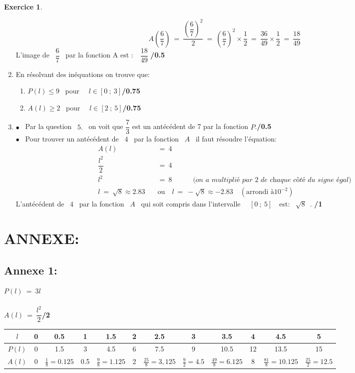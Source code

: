 \documentclass[a4paper,10pt]{article}
\theoremstyle{definition}
\theoremstyle{definition}
\newtheorem{exo}{Exercice}
\begin{document}
\begin{exo}
\begin{enumerate}
		 $$A\left(\dfrac{6}{7}\right) \ = \ \dfrac{\left(\dfrac{6}{7}\right)^2}{2} \ = \ \left(\dfrac{6}{7}\right)^2 \times \dfrac{1}{2} \ = \ \dfrac{36}{49} \times \dfrac{1}{2} \ = \ \dfrac{18}{49} $$
		 L'image de ~$\dfrac{6}{7}$~ par la fonction A est :~~$\dfrac{18}{49}$ \hfill\textbf{/0.5}
		\item En résolvant des inéquations on trouve que:
		\begin{enumerate}
			\item $P(l)\leq  9$ ~pour~~ $l\in[0~;~3]$\hfill\textbf{/0.75}
			\item $A(l)\geq 2$ ~pour~~ $l\in[2~;~5]$\hfill\textbf{/0.75}
		\end{enumerate}  
		\item  $\bullet$ ~Par la question ~$5.$~ on voit que $\dfrac{7}{3}$ est un antécédent de 7 par la fonction $P$.\hfill\textbf{/0.5}\\[1mm]
		 $\bullet$ ~Pour trouver un antécédent de ~$4$~ par la fonction ~$A$~ il faut résoudre l'équation:
		\begin{align*}
			A(l) \ &= \ 4\\
			\dfrac{l^2}{2} \ &= \ 4\\
			l^2 \ &= \ 8 \quad\quad\quad\textit{(on a multiplié par 2 de chaque côté du signe égal)}\\
			l \ = \ \sqrt{8}\approx 2.83  \quad&\text{ou}\quad l \ = \ -\sqrt{8}\approx -2.83 \quad(\text{arrondi à} 10^{-2})	
		\end{align*} 
		L'antécédent de ~$4$~ par la fonction ~$A$~ qui soit compris dans l'intervalle ~~$[0~;~5]$~~est: ~$\sqrt{8}$~.  \hfill\textbf{/1}		
	\end{enumerate}	
\end{exo}


\newpage
\section*{ANNEXE:}
\subsection*{Annexe 1:}
\noindent$P(l)\ = \  3l $\\\\
$A(l) \ = \ \dfrac{l^2}{2} $\hfill\textbf{/2}

	
	\begin{flushleft}
	\begin{tabular}{|c|c|c|c|c|c|c|c|c|c|c|c|}
		
		\hline
		$l$ & 0  &0.5  &1  & 1.5 & 2& 2.5 & 3 & 3.5 & 4 &4.5 & 5 \\
		\hline
		$P(l)$&0 &1.5 &3 &4.5& 6&7.5 &9 &10.5 &12 &13.5 &15  \\
		\hline
		$A(l)$ & 0 & $\frac{1}{8} = 0.125$& 0.5 &$\frac{9}{8} = 1.125$ & 2 & $\frac{25}{8} = 3,125$ & $\frac{9}{2} = 4.5$ & $\frac{49}{8} = 6.125$& 8 & $\frac{81}{8} = 10.125$ & $\frac{25}{2} = 12.5$\\
		
		\hline
		
	\end{tabular}	
	\end{flushleft}
\end{document}
